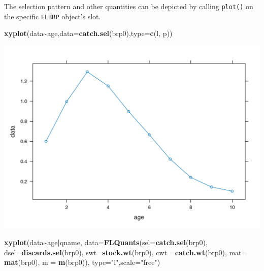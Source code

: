 \documentclass[
]{book}
\newenvironment{Shaded}{\begin{snugshade}}{\end{snugshade}}
\newcommand{\AttributeTok}[1]{\textcolor[rgb]{0.13,0.29,0.53}{#1}}
\newcommand{\FunctionTok}[1]{\textcolor[rgb]{0.13,0.29,0.53}{\textbf{#1}}}
\newcommand{\NormalTok}[1]{#1}
\newcommand{\SpecialCharTok}[1]{\textcolor[rgb]{0.81,0.36,0.00}{\textbf{#1}}}
\newcommand{\StringTok}[1]{\textcolor[rgb]{0.31,0.60,0.02}{#1}}
\begin{document}
The selection pattern and other quantities can be depicted by calling \texttt{plot()} on the specific \texttt{FLBRP} object's slot.

\begin{Shaded}
\begin{Highlighting}[]
\FunctionTok{xyplot}\NormalTok{(data}\SpecialCharTok{\textasciitilde{}}\NormalTok{age,}\AttributeTok{data=}\FunctionTok{catch.sel}\NormalTok{(brp0),}\AttributeTok{type=}\FunctionTok{c}\NormalTok{(}\StringTok{\textquotesingle{}l\textquotesingle{}}\NormalTok{, }\StringTok{\textquotesingle{}p\textquotesingle{}}\NormalTok{))}
\end{Highlighting}
\end{Shaded}

\includegraphics{_bookdown_files/_main_files/figure-html/selection pattern-1.png}

\begin{Shaded}
\begin{Highlighting}[]
\FunctionTok{xyplot}\NormalTok{(data}\SpecialCharTok{\textasciitilde{}}\NormalTok{age}\SpecialCharTok{|}\NormalTok{qname, }\AttributeTok{data=}\FunctionTok{FLQuants}\NormalTok{(}\AttributeTok{sel=}\FunctionTok{catch.sel}\NormalTok{(brp0),}
    \AttributeTok{dsel=}\FunctionTok{discards.sel}\NormalTok{(brp0), }\AttributeTok{swt=}\FunctionTok{stock.wt}\NormalTok{(brp0),}
    \AttributeTok{cwt =}\FunctionTok{catch.wt}\NormalTok{(brp0), }\AttributeTok{mat=} \FunctionTok{mat}\NormalTok{(brp0), }\AttributeTok{m =} \FunctionTok{m}\NormalTok{(brp0)),}
    \AttributeTok{type=}\StringTok{"l"}\NormalTok{,}\AttributeTok{scale=}\StringTok{"free"}\NormalTok{)}
\end{Highlighting}
\end{Shaded}
\end{document}
